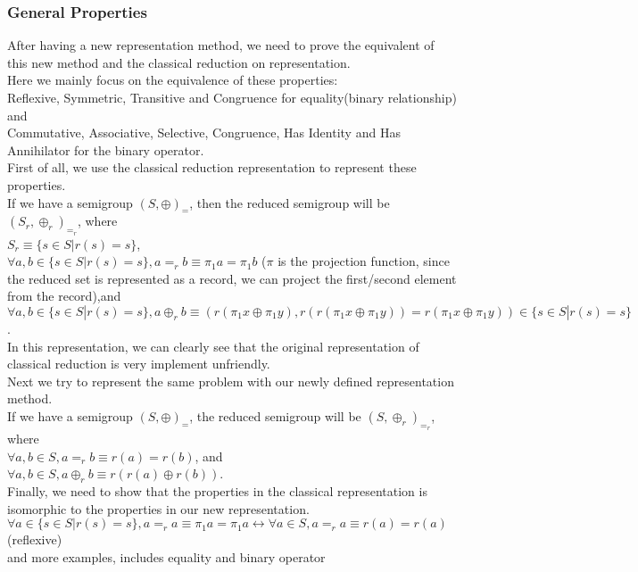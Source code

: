 \documentclass[a4paper,10pt]{article}
\begin{document}
\subsubsection{General Properties}
After having a new representation method, we need to prove the equivalent of this new method and the classical reduction on representation.\\
Here we mainly focus on the equivalence of these properties:\\
Reflexive, Symmetric, Transitive and Congruence for equality(binary relationship) and\\
Commutative, Associative, Selective, Congruence, Has Identity and Has Annihilator for the binary operator.\\
First of all, we use the classical reduction representation to represent these properties.\\
If we have a semigroup $(S,\oplus)_=$, then the reduced semigroup will be $(S_r,\oplus_r)_{=_r}$, where\\
$S_r \equiv \{s\in S|r(s)= s\}$, \\ 
$\forall a,b \in \{s\in S|r(s)= s\}, a =_r b \equiv \pi_1a = \pi_1 b$ ($\pi$ is the projection function, since the reduced set is represented as a record, we can project the first/second element from the record),and\\
$\forall a,b \in \{s\in S|r(s)= s\}, a \oplus_r b \equiv (r(\pi_1x \oplus \pi_1y), r(r(\pi_1x \oplus \pi_1y)) = r(\pi_1x \oplus \pi_1y)) \in \{s\in S|r(s)= s\}$.\\
In this representation, we can clearly see that the original representation of classical reduction is very implement unfriendly.\\
Next we try to represent the same problem with our newly defined representation method.\\
If we have a semigroup $(S,\oplus)_=$, the reduced semigroup will be $(S,\oplus_r)_{=_r}$, where\\
$\forall a,b \in S, a =_r b \equiv r(a) = r(b)$, and\\
$\forall a,b \in S, a \oplus_r b \equiv  r(r (a) \oplus r(b))$.\\
Finally, we need to show that the properties in the classical representation is isomorphic to the properties in our new representation.\\
$\forall a \in \{s\in S|r(s)= s\}, a =_r a \equiv \pi_1a = \pi_1 a \longleftrightarrow \forall a \in S, a =_r a \equiv r(a) = r(a)$ (reflexive)\\
and more examples, includes equality and binary operator\\\\
\end{document}
